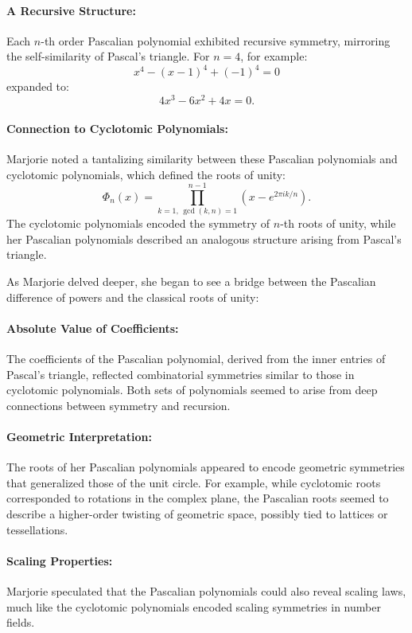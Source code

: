 \paragraph{A Recursive Structure:} Each \(n\)-th order Pascalian polynomial exhibited recursive symmetry, mirroring the self-similarity of Pascal’s triangle. For \(n=4\), for example:
\[
x^4 - (x-1)^4 + (-1)^4 = 0
\]
expanded to:
\[
4x^3 - 6x^2 + 4x = 0.
\]

\paragraph{Connection to Cyclotomic Polynomials:} Marjorie noted a tantalizing similarity between these Pascalian polynomials and cyclotomic polynomials, which defined the roots of unity:
\[
\Phi_n(x) = \prod_{k=1, \, \gcd(k,n)=1}^{n-1} (x - e^{2\pi i k / n}).
\]
The cyclotomic polynomials encoded the symmetry of \(n\)-th roots of unity, while her Pascalian polynomials described an analogous structure arising from Pascal’s triangle.

As Marjorie delved deeper, she began to see a bridge between the Pascalian difference of powers and the classical roots of unity:

\paragraph{Absolute Value of Coefficients:} The coefficients of the Pascalian polynomial, derived from the inner entries of Pascal’s triangle, reflected combinatorial symmetries similar to those in cyclotomic polynomials. Both sets of polynomials seemed to arise from deep connections between symmetry and recursion.

\paragraph{Geometric Interpretation:} The roots of her Pascalian polynomials appeared to encode geometric symmetries that generalized those of the unit circle. For example, while cyclotomic roots corresponded to rotations in the complex plane, the Pascalian roots seemed to describe a higher-order twisting of geometric space, possibly tied to lattices or tessellations.

\paragraph{Scaling Properties:} Marjorie speculated that the Pascalian polynomials could also reveal scaling laws, much like the cyclotomic polynomials encoded scaling symmetries in number fields.

